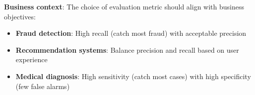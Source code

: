 \textbf{Business context}:
The choice of evaluation metric should align with business objectives:
\begin{itemize}
	\item \textbf{Fraud detection}: High recall (catch most fraud) with acceptable precision
	\item \textbf{Recommendation systems}: Balance precision and recall based on user experience
	\item \textbf{Medical diagnosis}: High sensitivity (catch most cases) with high specificity (few false alarms)
\end{itemize}
